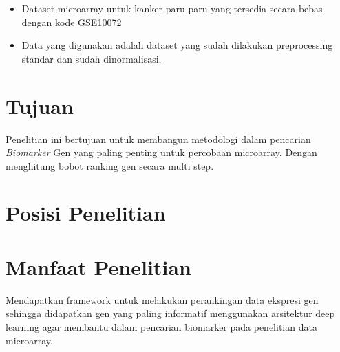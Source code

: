 \begin{itemize}
\item Dataset microarray untuk kanker paru-paru yang tersedia secara bebas dengan kode GSE10072
\item Data yang digunakan adalah dataset yang sudah dilakukan preprocessing standar dan sudah dinormalisasi.
\end{itemize}

\section{Tujuan}
Penelitian ini bertujuan untuk membangun metodologi dalam pencarian \textit{Biomarker} Gen yang paling penting untuk percobaan microarray. Dengan menghitung bobot ranking gen secara multi step.

\section{Posisi Penelitian}




\section{Manfaat Penelitian}
Mendapatkan framework untuk melakukan perankingan data ekspresi gen sehingga didapatkan gen yang paling informatif menggunakan arsitektur deep learning agar membantu dalam pencarian biomarker pada penelitian data microarray.

